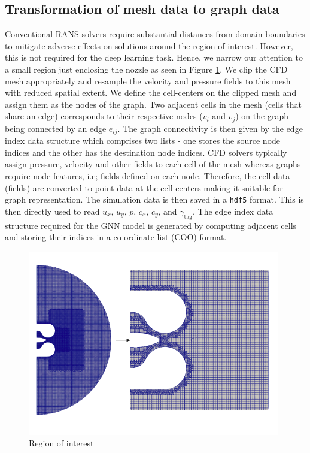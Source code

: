 \subsection{Transformation of mesh data to graph data}
Conventional RANS solvers require substantial distances from domain boundaries to mitigate adverse effects on solutions around the region of interest. However, this is not required for the deep learning task. Hence, we narrow our attention to a small region just enclosing the nozzle as seen in Figure \ref{clipmesh}. We clip the CFD mesh appropriately and resample the velocity and pressure fields to this mesh with reduced spatial extent. We define the cell-centers on the clipped mesh and assign them as the nodes of the graph. Two adjacent cells in the mesh (cells that share an edge) corresponds to their respective nodes ($v_i$ and $v_j$) on the graph being connected by an edge $e_{ij}$. The graph connectivity is then given by the edge index data structure which comprises two lists - one stores the source node indices and the other has the destination node indices. CFD solvers typically assign pressure, velocity and other fields to each cell of the mesh whereas graphs require node features, i.e; fields defined on each node. Therefore, the cell data (fields) are converted to point data at the cell centers making it suitable for graph representation. The simulation data is then saved in a \verb|hdf5| format. This is then directly used to read $u_{x}$, $u_{y}$, $p$, $c_x$, $c_y$, and $\gamma_{\operatorname{tag}}$. The edge index data structure required for the GNN model is generated by computing adjacent cells and storing their indices in a co-ordinate list (COO) format. 
\begin{figure}[ht]
    \centering
    \includegraphics[width=11cm]{images/Methodology/Clipped.png}
    \caption{Region of interest}
    \label{clipmesh}
\end{figure}
